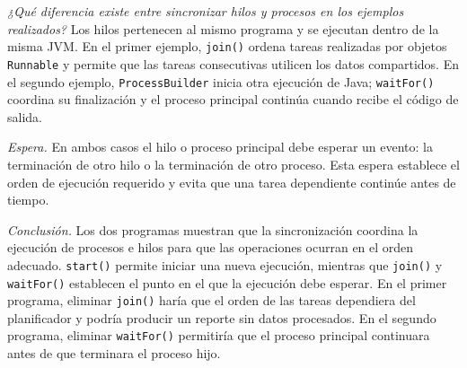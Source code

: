 \documentclass[12pt,oneside]{template/liverpoolthesis}
\begin{document}
\emph{¿Qué diferencia existe entre sincronizar hilos y procesos en los
ejemplos realizados?} Los hilos pertenecen al mismo programa y se ejecutan
dentro de la misma JVM. En el primer ejemplo, \texttt{join()} ordena tareas
realizadas por objetos \texttt{Runnable} y permite que las tareas consecutivas
utilicen los datos compartidos. En el segundo ejemplo, \texttt{ProcessBuilder}
inicia otra ejecución de Java; \texttt{waitFor()} coordina su finalización y
el proceso principal continúa cuando recibe el código de salida.

\emph{Espera.} En ambos casos el hilo o proceso principal debe esperar un
evento: la terminación de otro hilo o la terminación de otro proceso. Esta
espera establece el orden de ejecución requerido y evita que una tarea
dependiente continúe antes de tiempo.

\emph{Conclusión.} Los dos programas muestran que la sincronización coordina
la ejecución de procesos e hilos para que las operaciones ocurran en el orden
adecuado. \texttt{start()} permite iniciar una nueva ejecución, mientras que
\texttt{join()} y \texttt{waitFor()} establecen el punto en el que la
ejecución debe esperar. En el primer programa, eliminar \texttt{join()} haría
que el orden de las tareas dependiera del planificador y podría producir un
reporte sin datos procesados. En el segundo programa, eliminar \texttt{waitFor()}
permitiría que el proceso principal continuara antes de que terminara el
proceso hijo.

\cleardoublepage
{}
{}
\nocite{*}

\end{document}
